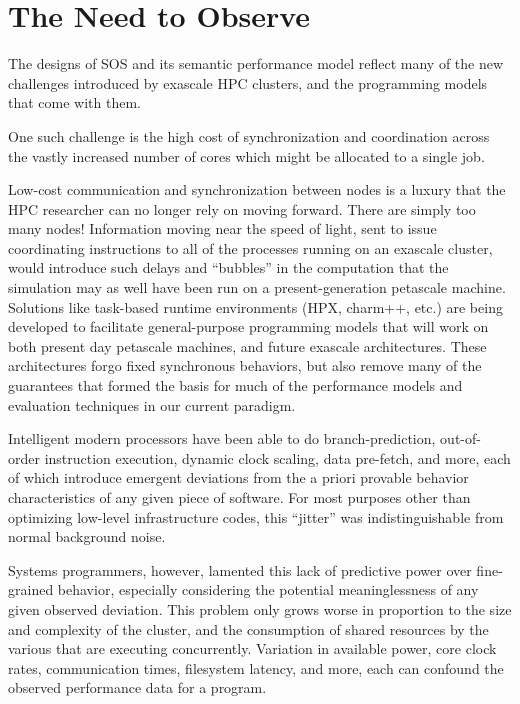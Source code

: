 
\section{The Need to Observe}
The designs of SOS and its semantic performance model reflect many of
the new challenges introduced by exascale HPC clusters, and the
programming models that come with them.

One such challenge is the high cost of synchronization and
coordination across the vastly increased number of cores which might
be allocated to a single job.

Low-cost communication and synchronization between nodes is a luxury
that the HPC researcher can no longer rely on moving forward. There
are simply too many nodes! Information moving near the speed of light,
sent to issue coordinating instructions to all of the processes
running on an exascale cluster, would introduce such delays and
``bubbles'' in the computation that the simulation may as well have
been run on a present-generation petascale
machine.  Solutions like task-based runtime
environments (HPX, charm++, etc.)  are being developed to facilitate
general-purpose programming models that will work on both present day
petascale machines, and future exascale architectures. These
architectures forgo fixed synchronous behaviors, but also remove many
of the guarantees that formed the basis for much of the performance
models and evaluation techniques in our current paradigm.

Intelligent modern processors have been able to do branch-prediction,
out-of-order instruction execution, dynamic clock scaling, data
pre-fetch, and more, each of which introduce emergent deviations from
the a priori provable behavior characteristics of any given piece of
software. For most purposes other than optimizing low-level
infrastructure codes, this ``jitter'' was indistinguishable from
normal background noise.

Systems programmers, however, lamented this lack of predictive power
over fine-grained behavior, especially considering the potential
meaninglessness of any given observed
deviation.   This
problem only grows worse in proportion to the size and complexity of
the cluster, and the consumption of shared resources by the various
that are executing concurrently.  Variation in available power, core
clock rates, communication times, filesystem latency, and more, each
can confound the observed performance data for a program.

